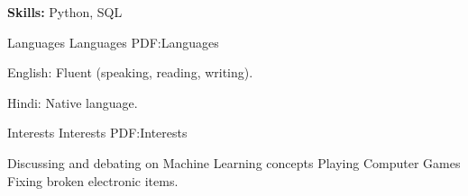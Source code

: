 \documentclass[letterpaper,MMMyyyy,nonstopmode]{simpleresumecv}
\begin{document}
\begin{Body}
                    \Gap

                    \Item
                        \textbf{Skills:}
                        Python, SQL
                
                
            
            \Section
            {Languages}
            {Languages}
            {PDF:Languages}
            
                \BulletItem
                English:  Fluent (speaking, reading, writing).
                
                \Gap
                
                \BulletItem
                Hindi: Native language.
            
            
            \Section
            {Interests}
            {Interests}
            {PDF:Interests}
            
                \Entry
                    \BulletItem
                        Discussing and debating on Machine Learning concepts
                    \BulletItem
                        Playing Computer Games
                    \BulletItem
                        Fixing broken electronic items.
        
        \end{Body}
    
    
\end{document}
